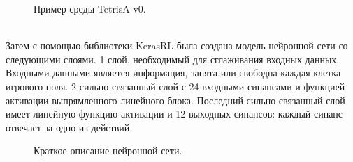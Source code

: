 \documentclass{article}
\begin{document}
\begin{figure}[h]
\caption{Пример среды TetrisA-v0.}
\label{ris:image}
\end{figure}\\
Затем с помощью библиотеки KerasRL была создана модель нейронной сети со следующими слоями. 1 слой, необходимый для сглаживания входных данных. Входными данными является информация, занята или свободна каждая клетка игрового поля. 2 сильно связанный слой с 24 входными синапсами и функцией активации выпрямленного линейного блока. Последний сильно связанный слой имеет линейную функцию активации и 12 выходных синапсов: каждый синапс отвечает за одно из действий.\\
\begin{figure}[h]
\caption{Краткое описание нейронной сети.}
\label{ris:image}
\end{figure}\\
\end{document}
